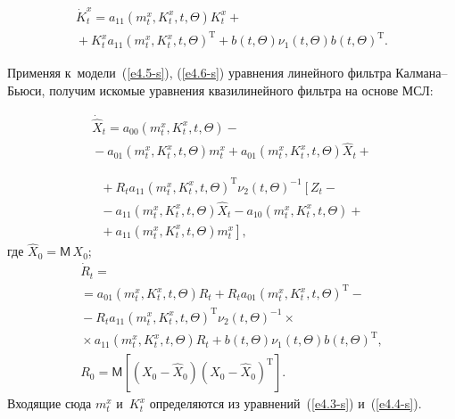 \begin{multicols}{2}
\vspace*{-1pt}

\noindent
\begin{multline}
\dot K_t^x = a_{11} \left(m_t^x, K_t^x, t,\Theta\right) K_t^x +{}\\
\!\!\!\!\!+ K_t^x a_{11} \left(m_t^x, K_t^x, t,\Theta\right)^{\mathrm{T}} \!\!\!+
   b(t,\Theta) \nu_1(t,\Theta)b(t,\Theta)^{\mathrm{T}}\!.\!\!\!\!\label{e4.7-s}
   \end{multline}
   
   \vspace*{-1pt}
   
   \noindent
Применяя к~модели~(\ref{e4.5-s}), (\ref{e4.6-s}) уравнения  линейного фильтра
Кал\-ма\-на--Бью\-си, получим искомые уравнения квазилинейного
фильтра на основе МСЛ:

\noindent
\begin{multline*}
{\dot{\hat X}}_t =a_{00} \left(m_t^x, K_t^x, t,\Theta\right) - {}\\
{}-
a_{01}\left(m_t^x, K_t^x, t,\Theta\right) m_t^x +
a_{01} \left(m_t^x, K_t^x, t,\Theta\right)\hat X_t + {}
\end{multline*}

\noindent
\begin{multline}
{}+
R_t a_{11}\left(m_t^x, K_t^x, t,\Theta\right)^{\mathrm{T}} \nu_2 (t,\Theta)^{-1}
 \left[ Z_t -{}\right.\\
 {}-a_{11}\left(m_t^x, K_t^x, t,\Theta\right) \hat X_t -
  a_{10}\left(m_t^x, K_t^x, t,\Theta\right)+{}\\
\left.  {}+
  a_{11} \left(m_t^x, K_t^x, t,\Theta\right)m_t^x\right] ,\label{e4.8-s}
  \end{multline}
где $\hat X_0 =\mathsf{M}\,X_0$;
\begin{multline}
\dot R_t ={}\\
{}=a_{01} \left(m_t^x, K_t^x, t,\Theta\right)R_t + 
R_t a_{01}\left(m_t^x, K_t^x, t,\Theta\right)^{\mathrm{T}}-{}\\
{}- R_t a_{11} \left(m_t^x, K_t^x, t,\Theta\right)^{\mathrm{T}} \nu_2 (t,\Theta)^{-1}\times{}\\
{}\times 
a_{11} \left(m_t^x, K_t^x, t,\Theta\right)R_t+ b(t,\Theta) \nu_1(t,\Theta) b(t,\Theta)^{\mathrm{T}},\\  
  R_0 =\mathsf{M}\left[ \left(X_0-\hat X_0\right) \left(X_0 -\hat X_0\right)^{\mathrm{T}}\right].
  \label{e4.9-s}
  \end{multline}
Входящие сюда $m_t^x$ и~$K_t^x$ определяются из уравнений~(\ref{e4.3-s})
и~(\ref{e4.4-s}).


\end{multicols}
